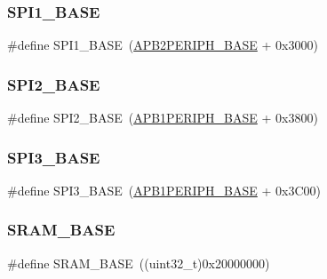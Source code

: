 \subsubsection{\texorpdfstring{SPI1\_BASE}{SPI1\_BASE}}
{\footnotesize\ttfamily \#define S\+P\+I1\+\_\+\+B\+A\+SE~(\mbox{\hyperlink{group___peripheral__memory__map_ga25b99d6065f1c8f751e78f43ade652cb}{A\+P\+B2\+P\+E\+R\+I\+P\+H\+\_\+\+B\+A\+SE}} + 0x3000)}

\mbox{\label{group___peripheral__memory__map_gac3e357b4c25106ed375fb1affab6bb86}} 
\subsubsection{\texorpdfstring{SPI2\_BASE}{SPI2\_BASE}}
{\footnotesize\ttfamily \#define S\+P\+I2\+\_\+\+B\+A\+SE~(\mbox{\hyperlink{group___peripheral__memory__map_ga45666d911f39addd4c8c0a0ac3388cfb}{A\+P\+B1\+P\+E\+R\+I\+P\+H\+\_\+\+B\+A\+SE}} + 0x3800)}

\mbox{\label{group___peripheral__memory__map_gae634fe8faa6922690e90fbec2fc86162}} 
\subsubsection{\texorpdfstring{SPI3\_BASE}{SPI3\_BASE}}
{\footnotesize\ttfamily \#define S\+P\+I3\+\_\+\+B\+A\+SE~(\mbox{\hyperlink{group___peripheral__memory__map_ga45666d911f39addd4c8c0a0ac3388cfb}{A\+P\+B1\+P\+E\+R\+I\+P\+H\+\_\+\+B\+A\+SE}} + 0x3\+C00)}

\mbox{\label{group___peripheral__memory__map_ga05e8f3d2e5868754a7cd88614955aecc}} 
\subsubsection{\texorpdfstring{SRAM\_BASE}{SRAM\_BASE}}
{\footnotesize\ttfamily \#define S\+R\+A\+M\+\_\+\+B\+A\+SE~((uint32\+\_\+t)0x20000000)}

